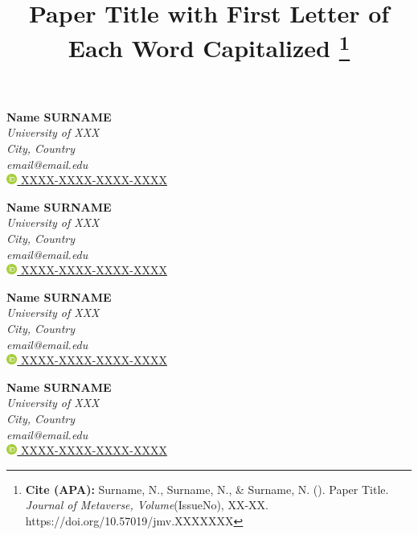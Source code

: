 \documentclass[a4paper]{article}
\title{
    \textbf{Paper Title with First Letter of Each Word Capitalized} 
    \thanks{
        \sloppy
        \textbf{Cite (APA):} Surname, N., Surname, N., \& Surname, N. (\the\year). Paper Title. \textit{Journal of Metaverse, Volume}(IssueNo), XX-XX. https://doi.org/10.57019/jmv.XXXXXXX
    }
}
\date{} %
\begin{document}
\maketitle
\vspace{-1.5cm}
\thispagestyle{firstpage}

\begin{multicols}{3}
    \centering
    \textbf{Name SURNAME}\\
    \textit{University of XXX}\\
    \textit{City, Country}\\
    \textit{email@email.edu}\\
    \href{https://orcid.org/XXXX-XXXX-XXXX-XXXX}{%
    \includegraphics[width=10pt]{orcid.png}
    XXXX-XXXX-XXXX-XXXX
	}
	\vfill

    \textbf{Name SURNAME}\\
    \textit{University of XXX}\\
    \textit{City, Country}\\
    \textit{email@email.edu}\\
    \href{https://orcid.org/XXXX-XXXX-XXXX-XXXX}{%
    \includegraphics[width=10pt]{orcid.png}
    XXXX-XXXX-XXXX-XXXX
	}    
    \vfill

    \columnbreak

    \textbf{Name SURNAME}\\
    \textit{University of XXX}\\
    \textit{City, Country}\\
    \textit{email@email.edu}\\
    \href{https://orcid.org/XXXX-XXXX-XXXX-XXXX}{%
    \includegraphics[width=10pt]{orcid.png}
    XXXX-XXXX-XXXX-XXXX
	}  
    \vfill

    \textbf{Name SURNAME}\\
    \textit{University of XXX}\\
    \textit{City, Country}\\
    \textit{email@email.edu}\\
    \href{https://orcid.org/XXXX-XXXX-XXXX-XXXX}{%
    \includegraphics[width=10pt]{orcid.png}
    XXXX-XXXX-XXXX-XXXX
	}  
    \vfill


\end{multicols}
\end{document}
